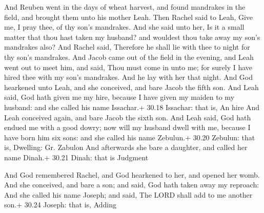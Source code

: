  And Reuben went in the days of wheat harvest, and found
mandrakes in the field, and brought them unto his mother Leah. Then
Rachel said to Leah, Give me, I pray thee, of thy son's mandrakes.
 And she said unto her, Is it a small matter that thou hast
taken my husband? and wouldest thou take away my son's mandrakes also?
And Rachel said, Therefore he shall lie with thee to night for thy son's
mandrakes.  And Jacob came out of the field in the evening,
and Leah went out to meet him, and said, Thou must come in unto me; for
surely I have hired thee with my son's mandrakes. And he lay with her
that night.  And God hearkened unto Leah, and she
conceived, and bare Jacob the fifth son.  And Leah said,
God hath given me my hire, because I have given my maiden to my husband:
and she called his name Issachar.+ 30.18 Issachar: that is, An hire
 And Leah conceived again, and bare Jacob the sixth son.
 And Leah said, God hath endued me with a good dowry; now
will my husband dwell with me, because I have born him six sons: and she
called his name Zebulun.+ 30.20 Zebulun: that is, Dwelling: Gr. Zabulon
 And afterwards she bare a daughter, and called her name
Dinah.+ 30.21 Dinah: that is Judgment

 And God remembered Rachel, and God hearkened to her, and
opened her womb.  And she conceived, and bare a son; and
said, God hath taken away my reproach:  And she called his
name Joseph; and said, The LORD shall add to me another son.+ 30.24
Joseph: that is, Adding

